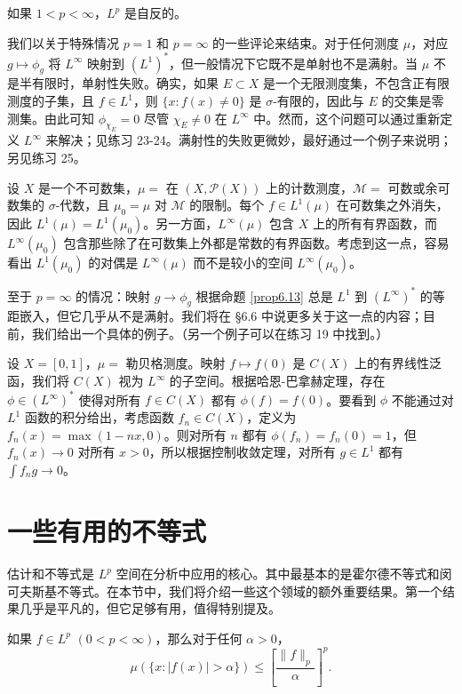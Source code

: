 \documentclass[lang=cn,10pt,thmcnt=section]{elegantbook}
\begin{document}
\begin{corollary}\label{corollary6.16}
如果 $1 < p < \infty$，$L^p$ 是自反的。
\end{corollary}

我们以关于特殊情况 $p=1$ 和 $p=\infty$ 的一些评论来结束。对于任何测度 $\mu$，对应 $g \mapsto \phi_g$ 将 $L^\infty$ 映射到 $(L^1)^*$，但一般情况下它既不是单射也不是满射。当 $\mu$ 不是半有限时，单射性失败。确实，如果 $E \subset X$ 是一个无限测度集，不包含正有限测度的子集，且 $f \in L^1$，则 $\{x : f(x) \neq 0\}$ 是 $\sigma$-有限的，因此与 $E$ 的交集是零测集。由此可知 $\phi_{\chi_E} = 0$ 尽管 $\chi_E \neq 0$ 在 $L^\infty$ 中。然而，这个问题可以通过重新定义 $L^\infty$ 来解决；见练习 23-24。满射性的失败更微妙，最好通过一个例子来说明；另见练习 25。

设 $X$ 是一个不可数集，$\mu = $ 在 $(X, \mathcal{P}(X))$ 上的计数测度，$\mathcal{M} = $ 可数或余可数集的 $\sigma$-代数，且 $\mu_0 = \mu$ 对 $\mathcal{M}$ 的限制。每个 $f \in L^1(\mu)$ 在可数集之外消失，因此 $L^1(\mu) = L^1(\mu_0)$。另一方面，$L^\infty(\mu)$ 包含 $X$ 上的所有有界函数，而 $L^\infty(\mu_0)$ 包含那些除了在可数集上外都是常数的有界函数。考虑到这一点，容易看出 $L^1(\mu_0)$ 的对偶是 $L^\infty(\mu)$ 而不是较小的空间 $L^\infty(\mu_0)$。

至于 $p = \infty$ 的情况：映射 $g \to \phi_g$ 根据命题 \ref{prop6.13} 总是 $L^1$ 到 $(L^\infty)^*$ 的等距嵌入，但它几乎从不是满射。我们将在 §6.6 中说更多关于这一点的内容；目前，我们给出一个具体的例子。（另一个例子可以在练习 19 中找到。）

设 $X = [0,1]$，$\mu = $ 勒贝格测度。映射 $f \mapsto f(0)$ 是 $C(X)$ 上的有界线性泛函，我们将 $C(X)$ 视为 $L^\infty$ 的子空间。根据哈恩-巴拿赫定理，存在 $\phi \in (L^\infty)^*$ 使得对所有 $f \in C(X)$ 都有 $\phi(f) = f(0)$。要看到 $\phi$ 不能通过对 $L^1$ 函数的积分给出，考虑函数 $f_n \in C(X)$，定义为 $f_n(x) = \max(1-nx, 0)$。则对所有 $n$ 都有 $\phi(f_n) = f_n(0) = 1$，但 $f_n(x) \to 0$ 对所有 $x > 0$，所以根据控制收敛定理，对所有 $g \in L^1$ 都有 $\int f_ng \to 0$。


\section{一些有用的不等式}

估计和不等式是 $L^p$ 空间在分析中应用的核心。其中最基本的是霍尔德不等式和闵可夫斯基不等式。在本节中，我们将介绍一些这个领域的额外重要结果。第一个结果几乎是平凡的，但它足够有用，值得特别提及。

\begin{theorem}[切比雪夫不等式]\label{theorem6.17}
如果 $f \in L^p$ $(0 < p < \infty)$，那么对于任何 $\alpha > 0$，
\[ \mu(\{x : |f(x)| > \alpha\}) \leq \left[ \frac{\|f\|_p}{\alpha} \right]^p. \]
\end{theorem}
\end{document}
